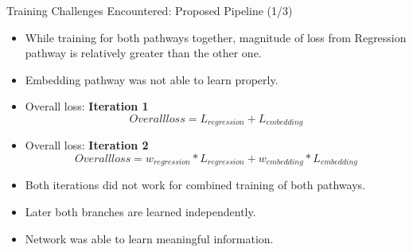 \documentclass[aspectratio=169]{beamer}
\begin{document}
\begin{frame}{Training Challenges Encountered: Proposed Pipeline (1/3)}
    \begin{itemize}
        \item While training for both pathways together, magnitude of loss from Regression pathway is relatively greater than the other one. 
        \item Embedding pathway was not able to learn properly.
        \item Overall loss: \textbf{Iteration 1}
        \begin{equation}
    Overall loss = L_{regression} + L_{embedding} 
\end{equation}
        \item Overall loss: \textbf{Iteration 2}
        \begin{equation}
    Overall loss = w_{regression} * L_{regression} + w_{embedding} * L_{embedding} 
        \end{equation}
        \item Both iterations did not work for combined training of both pathways.
        \item Later both branches are learned independently. 
        \item Network was able to learn meaningful information.
    \end{itemize}
        

\end{frame}
\end{document}
